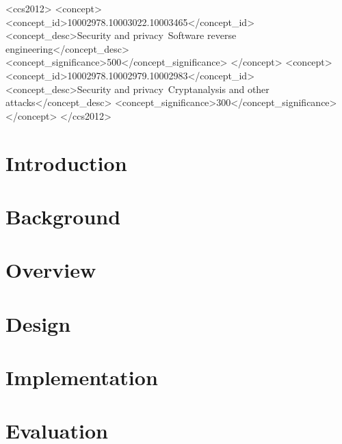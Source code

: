 \documentclass[sigconf]{acmart}
\begin{document}
%
%
\begin{CCSXML}
<ccs2012>
<concept>
<concept_id>10002978.10003022.10003465</concept_id>
<concept_desc>Security and privacy~Software reverse engineering</concept_desc>
<concept_significance>500</concept_significance>
</concept>
<concept>
<concept_id>10002978.10002979.10002983</concept_id>
<concept_desc>Security and privacy~Cryptanalysis and other attacks</concept_desc>
<concept_significance>300</concept_significance>
</concept>
</ccs2012>
\end{CCSXML}





\maketitle

\section{Introduction}
\label{sec:intro}



\section{Background}
\label{sec:mistakes}

 
 
 \section{Overview}
 \label{sec:overview}
 
 
 
\section{Design}
\label{sec:solution}

 

\section{Implementation}
\label{sec:kxray}



\section{Evaluation}
\label{sec:evaluation}

 
\end{document}
